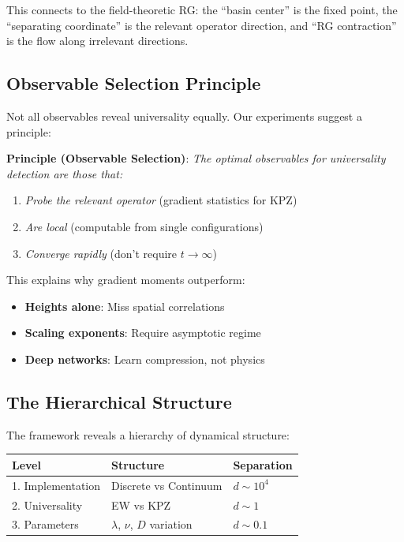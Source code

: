 \documentclass[aps,pre,twocolumn,superscriptaddress,showpacs,longbibliography]{revtex4-2}
\begin{document}
This connects to the field-theoretic RG: the ``basin center'' is the fixed point, the ``separating coordinate'' is the relevant operator direction, and ``RG contraction'' is the flow along irrelevant directions.

\subsection{Observable Selection Principle}

Not all observables reveal universality equally. Our experiments suggest a principle:

\textbf{Principle (Observable Selection)}: \emph{The optimal observables for universality detection are those that:}
\begin{enumerate}
\item \emph{Probe the relevant operator} (gradient statistics for KPZ)
\item \emph{Are local} (computable from single configurations)
\item \emph{Converge rapidly} (don't require $t \to \infty$)
\end{enumerate}

This explains why gradient moments outperform:
\begin{itemize}
\item \textbf{Heights alone}: Miss spatial correlations
\item \textbf{Scaling exponents}: Require asymptotic regime
\item \textbf{Deep networks}: Learn compression, not physics
\end{itemize}

\subsection{The Hierarchical Structure}

The framework reveals a hierarchy of dynamical structure:

\begin{center}
\begin{tabular}{lll}
\textbf{Level} & \textbf{Structure} & \textbf{Separation} \\
\hline
1. Implementation & Discrete vs Continuum & $d \sim 10^4$ \\
2. Universality & EW vs KPZ & $d \sim 1$ \\
3. Parameters & $\lambda$, $\nu$, $D$ variation & $d \sim 0.1$ \\
\end{tabular}
\end{center}
\end{document}
